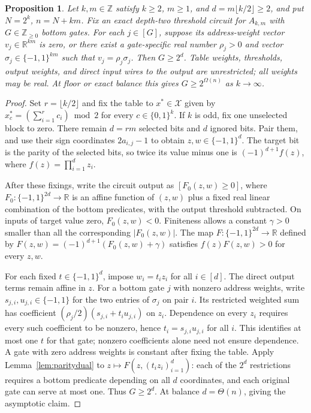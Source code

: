 \documentclass[11pt]{article}
\newtheorem{proposition}[theorem]{Proposition}
\newcommand{\bits}{\{0,1\}}
\begin{document}
\begin{proposition}\label{thm:fullsign}
Let $k,m\in\mathbb Z$ satisfy $k\ge2$, $m\ge1$, and
$d=m\lfloor k/2\rfloor\ge2$, and put $N=2^k$, $n=N+km$.
Fix an exact depth-two threshold circuit for $A_{k,m}$ with
$G\in\mathbb Z_{\ge0}$ bottom gates.
For each $j\in[G]$, suppose its address-weight vector
$v_j\in\mathbb R^{km}$ is zero, or there exist a gate-specific real number
$\rho_j>0$ and vector $\sigma_j\in\{-1,1\}^{km}$ such that
$v_j=\rho_j\sigma_j$.
Then $G\ge2^d$. Table weights, thresholds, output weights, and direct
input wires to the output are unrestricted; all weights may be real.
At floor or exact balance this gives $G\ge2^{\Omega(n)}$ as $k\to\infty$.
\end{proposition}
\begin{proof}
Set $r=\lfloor k/2\rfloor$ and fix the table to
$x^*\in\mathcal X$ given by $x^*_c=(\sum_{i=1}^r c_i)\bmod2$ for every
$c\in\bits^k$. If $k$ is odd, fix one unselected block to zero.
There remain $d=rm$ selected bits and $d$ ignored bits.
Pair them, and use their sign coordinates $2a_{i,j}-1$ to obtain
$z,w\in\{-1,1\}^d$. The target bit is the parity of the selected bits,
so twice its value minus one is $(-1)^{d+1}f(z)$, where $f(z)=\prod_{i=1}^d z_i$.

After these fixings, write the circuit output as $[F_0(z,w)\ge0]$,
where $F_0:\{-1,1\}^{2d}\to\mathbb R$ is an affine function of $(z,w)$ plus a fixed real linear combination
of the bottom predicates,
with the output threshold subtracted.
On inputs of target value zero, $F_0(z,w)<0$. Finiteness allows a constant
$\gamma>0$ smaller than all the corresponding $|F_0(z,w)|$.
The map $F:\{-1,1\}^{2d}\to\mathbb R$ defined by
$F(z,w)=(-1)^{d+1}(F_0(z,w)+\gamma)$ satisfies
$f(z)F(z,w)>0$ for every $z,w$.

For each fixed $t\in\{-1,1\}^d$, impose $w_i=t_i z_i$ for all $i\in[d]$.
The direct output terms remain affine in $z$.
For a bottom gate $j$ with nonzero address weights, write
$s_{j,i},u_{j,i}\in\{-1,1\}$ for the two entries of $\sigma_j$
on pair $i$. Its restricted weighted sum has coefficient
$(\rho_j/2)(s_{j,i}+t_i u_{j,i})$ on $z_i$.
Dependence on every $z_i$ requires every such coefficient to be nonzero,
hence $t_i=s_{j,i}u_{j,i}$ for all $i$. This identifies at most one $t$
for that gate; nonzero coefficients alone need not ensure dependence.
A gate with zero address weights is constant after fixing the table.
Apply Lemma~\ref{lem:paritydual} to $z\mapsto F(z,(t_i z_i)_{i=1}^d)$:
each of the $2^d$ restrictions requires a bottom predicate depending on
all $d$ coordinates, and each original gate can serve at most one.
Thus $G\ge2^d$. At balance $d=\Theta(n)$, giving the asymptotic claim.
\end{proof}
\end{document}
